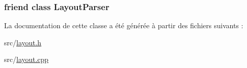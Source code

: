\subsubsection[{Layout\+Parser}]{\setlength{\rightskip}{0pt plus 5cm}friend class {\bf Layout\+Parser}\hspace{0.3cm}{\ttfamily [friend]}}\label{class_layout_doc_manager_aaa876b66a7f0c8c8766635655c0dff49}


La documentation de cette classe a été générée à partir des fichiers suivants \+:\begin{DoxyCompactItemize}
\item 
src/\hyperlink{layout_8h}{layout.\+h}\item 
src/\hyperlink{layout_8cpp}{layout.\+cpp}\end{DoxyCompactItemize}
